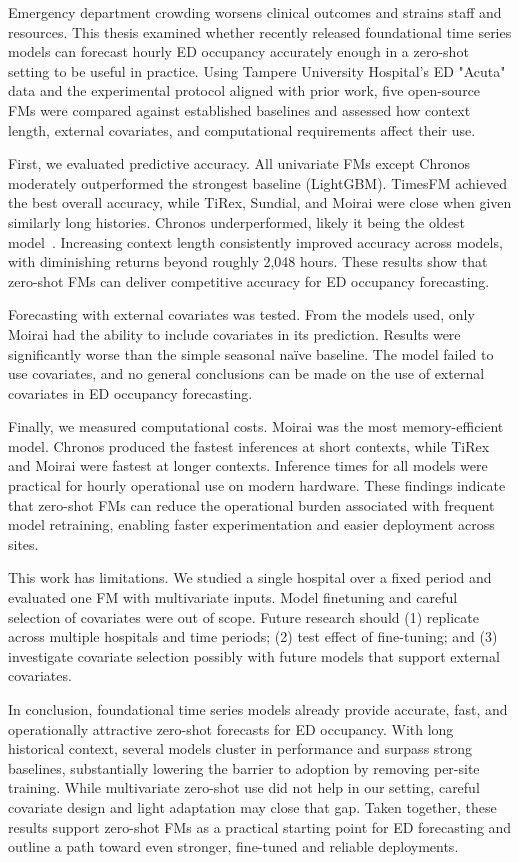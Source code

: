 Emergency department crowding worsens clinical outcomes and strains staff and resources. This thesis examined whether recently released foundational time series models can forecast hourly ED occupancy accurately enough in a zero-shot setting to be useful in practice. Using Tampere University Hospital’s ED "Acuta" data and the experimental protocol aligned with prior work, five open-source FMs were compared against established baselines and assessed how context length, external covariates, and computational requirements affect their use.

First, we evaluated predictive accuracy. All univariate FMs except Chronos moderately outperformed the strongest baseline (LightGBM). TimesFM achieved the best overall accuracy, while TiRex, Sundial, and Moirai were close when given similarly long histories. Chronos underperformed, likely it being the oldest model~\cite{amazon_chronos_bolt_base}. Increasing context length consistently improved accuracy across models, with diminishing returns beyond roughly 2,048 hours. These results show that zero-shot FMs can deliver competitive accuracy for ED occupancy forecasting.

Forecasting with external covariates was tested. From the models used, only Moirai had the ability to include covariates in its prediction. Results were significantly worse than the simple seasonal naïve baseline. The model failed to use covariates, and no general conclusions can be made on the use of external covariates in ED occupancy forecasting.

Finally, we measured computational costs. Moirai was the most memory-efficient model. Chronos produced the fastest inferences at short contexts, while TiRex and Moirai were fastest at longer contexts. Inference times for all models were practical for hourly operational use on modern hardware. These findings indicate that zero-shot FMs can reduce the operational burden associated with frequent model retraining, enabling faster experimentation and easier deployment across sites.

This work has limitations. We studied a single hospital over a fixed period and evaluated one FM with multivariate inputs. Model finetuning and careful selection of covariates were out of scope. Future research should (1) replicate across multiple hospitals and time periods; (2) test effect of fine-tuning; and (3) investigate covariate selection possibly with future models that support external covariates.

In conclusion, foundational time series models already provide accurate, fast, and operationally attractive zero-shot forecasts for ED occupancy. With long historical context, several models cluster in performance and surpass strong baselines, substantially lowering the barrier to adoption by removing per-site training. While multivariate zero-shot use did not help in our setting, careful covariate design and light adaptation may close that gap. Taken together, these results support zero-shot FMs as a practical starting point for ED forecasting and outline a path toward even stronger, fine-tuned and reliable deployments.